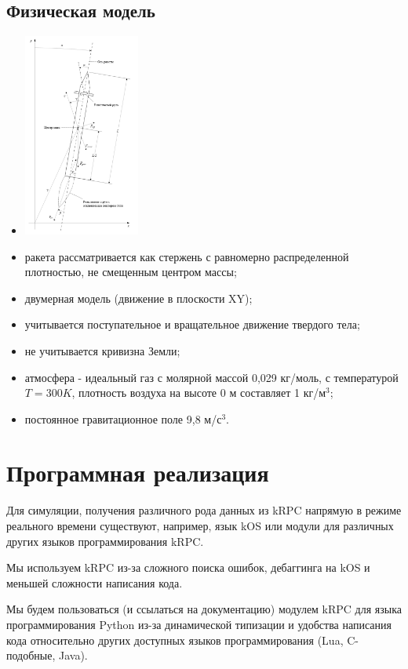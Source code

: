 \subsection{Физическая модель}

\begin{itemize}
	\item \includegraphics[width=0.3\textwidth]{rocket_scheme}	
	\item ракета рассматривается как стержень с равномерно распределенной плотностью, не смещенным центром массы;
	\item двумерная модель (движение в плоскости XY);
	\item учитывается поступательное и вращательное движение твердого тела;
	\item не учитывается кривизна Земли;
	\item атмосфера - идеальный газ с молярной массой 0,029 кг/моль, с температурой $T = 300 K$, плотность воздуха на высоте 0 м составляет 1 кг/$\mbox{м}^3$;
	\item постоянное гравитационное поле 9,8 м/$\mbox{с}^3$.
\end{itemize}

\section{Программная реализация}
Для симуляции, получения различного рода данных из kRPC напрямую в режиме реального времени существуют, например, язык kOS или модули для различных других языков программирования kRPC.

Мы используем kRPC из-за сложного поиска ошибок, дебаггинга на kOS и меньшей сложности написания кода.

Мы будем пользоваться (и ссылаться на документацию) модулем kRPC для языка программирования Python из-за динамической типизации и удобства написания кода относительно других доступных языков программирования (Lua, C-подобные, Java).

